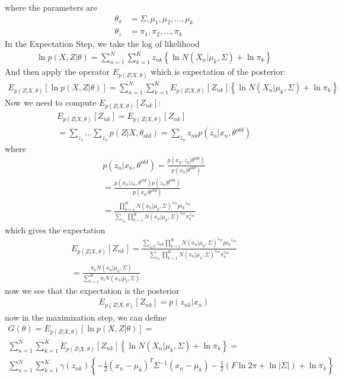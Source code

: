 \documentclass[12pt,twoside]{article}
\begin{document}
where the parameters are
\begin{align}
\theta_x &= {\Sigma, \mu_1, \mu_2, ..., \mu_k} \\
\theta_z &= {\pi_1, \pi_2, ..., \pi_k}
\end{align}
In the Expectation Step, we take the log of likelihood
\begin{align}
\ln p(X, Z|\theta) =  \sum_{n=1}^{N} \sum_{k=1}^{K} z_{nk} \left\lbrace\ln N(X_n | \mu_k, \Sigma) + \ln \pi_k \right\rbrace
\end{align}
And then apply the operator $E_{p(Z|X,\theta)}$ which is expectation of the posterior:
\begin{align}
E_{p(Z|X,\theta)} [\ln p(X, Z|\theta)] = \sum_{n=1}^{N} \sum_{k=1}^{K} E_{p(Z|X,\theta)} [Z_{nk}] \left\lbrace\ln N(X_n | \mu_k, \Sigma) + \ln \pi_k \right\rbrace
\end{align}
Now we need to compute $E_{p(Z|X,\theta)} [Z_{nk}]$:
\begin{align}
E_{p(Z|X,\theta)} [Z_{nk}] = E_{p(Z|X,\theta)} [Z_{nk}] \\
= \sum_{z_1}... \sum_{z_n} p(Z|X, \theta_{old}) = \sum_{z_n} z_{nk} p(z_n|x_n, \theta^{old})
\end{align}
where
\begin{align}
p(z_n|x_n, \theta^{old}) = \frac{p(x_n, z_n | \theta^{old})}{p(x_n|\theta^{old})} \\
=  \frac{p(x_n |z_n, \theta^{old})p(z_n|\theta^{old})}{p(x_n|\theta^{old})}\\
= \frac{\prod_{k=1}^{K}N(x_n|\mu_k, \Sigma)^{z_{nk}}{pi_k}^{z_{nk}}}{\sum_{z_n}\prod_{k=1}^{K} N(x_n|\mu_k, \Sigma)^{z_{nk}}\pi_k^{z_{nk}}}
\end{align}
which gives the expectation
\begin{align}
E_{p(Z|X,\theta)} [Z_{nk}] = \frac{\sum_{z_nk} z_{nk} \prod_{k=1}^{K}N(x_n|\mu_k, \Sigma)^{z_{nk}}{pi_k}^{z_{nk}}}{\sum_{z_n}\prod_{k=1}^{K} N(x_n|\mu_k, \Sigma)^{z_{nk}}\pi_k^{z_{nk}}} \\
= \frac{\pi_k N(x_n|\mu_k, \Sigma)}{\sum_{l=1}^{K} \pi_l N(x_n|\mu_l, \Sigma)}
\end{align}
now we see that the expectation is the posterior
\begin{align}
E_{p(Z|X,\theta)} [Z_{nk}] = p(z_{nk}|x_n)
\end{align}
now in the maximization step, we can define
\begin{align}
G(\theta) = E_{p(Z|X,\theta)} [\ln p(X, Z|\theta)] = \\
\sum_{n=1}^{N} \sum_{k=1}^{K} E_{p(Z|X,\theta)} [Z_{nk}] \left\lbrace\ln N(X_n | \mu_k, \Sigma) + \ln \pi_k \right\rbrace =\\
\sum_{n=1}^{N} \sum_{k=1}^{K} \gamma(z_{nk}) \left\lbrace -\frac{1}{2}(x_n - \mu_k)^T \Sigma^{-1}(x_n - \mu_k) -\frac{1}{2}(F\ln 2\pi + \ln |\Sigma |) + \ln \pi_k  \right\rbrace
\end{align}
\end{document}
